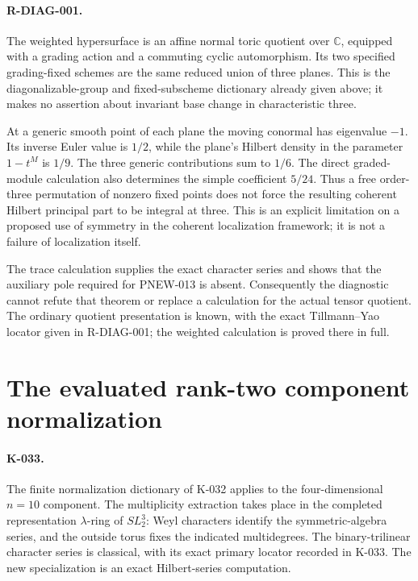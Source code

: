 \paragraph{R-DIAG-001.}
The weighted hypersurface is an affine normal toric quotient over
$\mathbb C$, equipped with a grading action and a commuting cyclic
automorphism. Its two specified grading-fixed schemes are the same
reduced union of three planes. This is the diagonalizable-group and
fixed-subscheme dictionary already given above; it makes no assertion
about invariant base change in characteristic three.

At a generic smooth point of each plane the moving conormal has
eigenvalue $-1$. Its inverse Euler value is $1/2$, while the plane's
Hilbert density in the parameter $1-t^M$ is $1/9$. The three generic
contributions sum to $1/6$. The direct graded-module calculation
also determines the simple coefficient $5/24$. Thus a free order-three
permutation of nonzero fixed points does not force the resulting
coherent Hilbert principal part to be integral at three. This is an
explicit limitation on a proposed use of symmetry in the coherent
localization framework; it is not a failure of localization itself.

The trace calculation supplies the exact character series and shows
that the auxiliary pole required for PNEW-013 is absent. Consequently
the diagnostic cannot refute that theorem or replace a calculation
for the actual tensor quotient. The ordinary quotient presentation is
known, with the exact Tillmann--Yao locator given in R-DIAG-001;
the weighted calculation is proved there in full.

\section{The evaluated rank-two component normalization}
\paragraph{K-033.}
The finite normalization dictionary of K-032 applies to the
four-dimensional $n=10$ component. The multiplicity extraction takes
place in the completed representation $\lambda$-ring of $SL_2^3$:
Weyl characters identify the symmetric-algebra series, and the outside
torus fixes the indicated multidegrees. The binary-trilinear character
series is classical, with its exact primary locator recorded in K-033.
The new specialization is an exact Hilbert-series computation.

